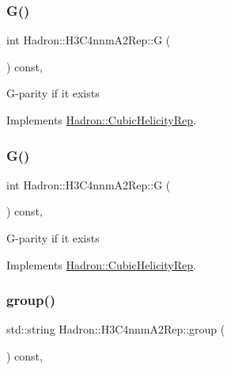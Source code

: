 \subsubsection{\texorpdfstring{G()}{G()}\hspace{0.1cm}{\footnotesize\ttfamily [1/2]}}
{\footnotesize\ttfamily int Hadron\+::\+H3\+C4nnm\+A2\+Rep\+::G (\begin{DoxyParamCaption}{ }\end{DoxyParamCaption}) const\hspace{0.3cm}{\ttfamily [inline]}, {\ttfamily [virtual]}}

G-\/parity if it exists 

Implements \mbox{\hyperlink{structHadron_1_1CubicHelicityRep_a50689f42be1e6170aa8cf6ad0597018b}{Hadron\+::\+Cubic\+Helicity\+Rep}}.

\mbox{\label{structHadron_1_1H3C4nnmA2Rep_a76c3746d753d21a46a22af12a8bcc087}} 
\subsubsection{\texorpdfstring{G()}{G()}\hspace{0.1cm}{\footnotesize\ttfamily [2/2]}}
{\footnotesize\ttfamily int Hadron\+::\+H3\+C4nnm\+A2\+Rep\+::G (\begin{DoxyParamCaption}{ }\end{DoxyParamCaption}) const\hspace{0.3cm}{\ttfamily [inline]}, {\ttfamily [virtual]}}

G-\/parity if it exists 

Implements \mbox{\hyperlink{structHadron_1_1CubicHelicityRep_a50689f42be1e6170aa8cf6ad0597018b}{Hadron\+::\+Cubic\+Helicity\+Rep}}.

\mbox{\label{structHadron_1_1H3C4nnmA2Rep_a057eae346cf6d906b23501bceef95e9b}} 
\subsubsection{\texorpdfstring{group()}{group()}\hspace{0.1cm}{\footnotesize\ttfamily [1/3]}}
{\footnotesize\ttfamily std\+::string Hadron\+::\+H3\+C4nnm\+A2\+Rep\+::group (\begin{DoxyParamCaption}{ }\end{DoxyParamCaption}) const\hspace{0.3cm}{\ttfamily [inline]}, {\ttfamily [virtual]}}

